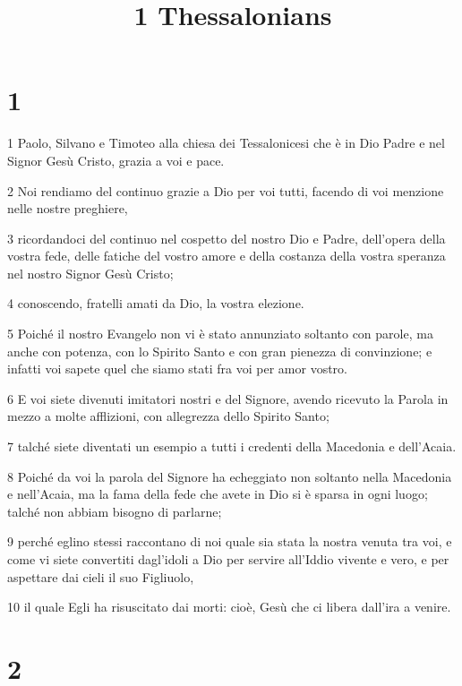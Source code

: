 

\title{1 Thessalonians}


\chapter{1}

\par 1 Paolo, Silvano e Timoteo alla chiesa dei Tessalonicesi che è in Dio Padre e nel Signor Gesù Cristo, grazia a voi e pace.
\par 2 Noi rendiamo del continuo grazie a Dio per voi tutti, facendo di voi menzione nelle nostre preghiere,
\par 3 ricordandoci del continuo nel cospetto del nostro Dio e Padre, dell'opera della vostra fede, delle fatiche del vostro amore e della costanza della vostra speranza nel nostro Signor Gesù Cristo;
\par 4 conoscendo, fratelli amati da Dio, la vostra elezione.
\par 5 Poiché il nostro Evangelo non vi è stato annunziato soltanto con parole, ma anche con potenza, con lo Spirito Santo e con gran pienezza di convinzione; e infatti voi sapete quel che siamo stati fra voi per amor vostro.
\par 6 E voi siete divenuti imitatori nostri e del Signore, avendo ricevuto la Parola in mezzo a molte afflizioni, con allegrezza dello Spirito Santo;
\par 7 talché siete diventati un esempio a tutti i credenti della Macedonia e dell'Acaia.
\par 8 Poiché da voi la parola del Signore ha echeggiato non soltanto nella Macedonia e nell'Acaia, ma la fama della fede che avete in Dio si è sparsa in ogni luogo; talché non abbiam bisogno di parlarne;
\par 9 perché eglino stessi raccontano di noi quale sia stata la nostra venuta tra voi, e come vi siete convertiti dagl'idoli a Dio per servire all'Iddio vivente e vero, e per aspettare dai cieli il suo Figliuolo,
\par 10 il quale Egli ha risuscitato dai morti: cioè, Gesù che ci libera dall'ira a venire.

\chapter{2}

